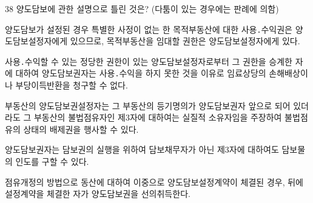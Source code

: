 \begin{question}{38}
양도담보에 관한 설명으로 틀린 것은? (다툼이 있는 경우에는 판례에 의함)
\begin{choices}
  \item 양도담보가 설정된 경우 특별한 사정이 없는 한 목적부동산에 대한 사용․수익권은 양도담보설정자에게 있으므로, 목적부동산을 임대할 권한은 양도담보설정자에게 있다.
  \item 사용․수익할 수 있는 정당한 권한이 있는 양도담보설정자로부터 그 권한을 승계한 자에 대하여 양도담보권자는 사용․수익을 하지 못한 것을 이유로 임료상당의 손해배상이나 부당이득반환을 청구할 수 없다.
  \item 부동산의 양도담보권설정자는 그 부동산의 등기명의가 양도담보권자 앞으로 되어 있더라도 그 부동산의 불법점유자인 제3자에 대하여는 실질적 소유자임을 주장하여 불법점유의 상태의 배제권을 행사할 수 있다.
  \item 양도담보권자는 담보권의 실행을 위하여 담보채무자가 아닌 제3자에 대하여도 담보물의 인도를 구할 수 있다.
  \item 점유개정의 방법으로 동산에 대하여 이중으로 양도담보설정계약이 체결된 경우, 뒤에 설정계약을 체결한 자가 양도담보권을 선의취득한다.
\end{choices}
\end{question}
